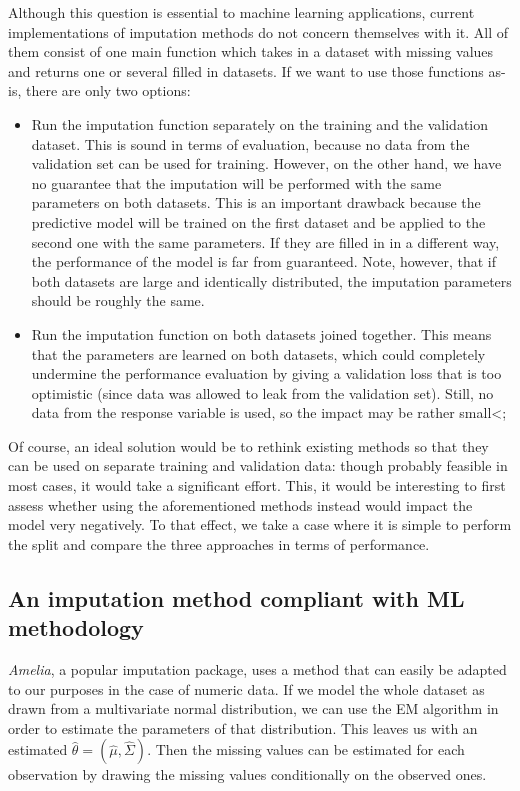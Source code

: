 \documentclass[12pt, a4paper]{article}
\begin{document}
Although this question is essential to machine learning applications, current implementations of imputation methods do not concern themselves with it. All of them consist of one main function which takes in a dataset with missing values and returns one or several filled in datasets. If we want to use those functions as-is, there are only two options:
\begin{itemize}
\item Run the imputation function separately on the training and the validation dataset. This is sound in terms of evaluation, because no data from the validation set can be used for training. However, on the other hand, we have no guarantee that the imputation will be performed with the same parameters on both datasets. This is an important drawback because the predictive model will be trained on the first dataset and be applied to the second one with the same parameters. If they are filled in in a different way, the performance of the model is far from guaranteed. Note, however, that if both datasets are large and identically distributed, the imputation parameters should be roughly the same.

\item Run the imputation function on both datasets joined together. This means that the parameters are learned on both datasets, which could completely undermine the performance evaluation by giving a validation loss that is too optimistic (since data was allowed to leak from the validation set). Still, no data from the response variable is used, so the impact may be rather small<;
\end{itemize}

Of course, an ideal solution would be to rethink existing methods so that they can be used on separate training and validation data: though probably feasible in most cases, it would take a significant effort. This, it would be interesting to first assess whether using the aforementioned methods instead would impact the model very negatively. To that effect, we take a case where it is simple to perform the split and compare the three approaches in terms of performance.
\subsection{An imputation method compliant with ML methodology}
\emph{Amelia}, a popular imputation package, uses a method that can easily be adapted to our purposes in the case of numeric data. If we model the whole dataset as drawn from a multivariate normal distribution, we can use the EM algorithm in order to estimate the parameters of that distribution. This leaves us with an estimated $\hat{\theta} = (\hat{\mu}, \hat{\Sigma})$. Then the missing values can be estimated for each observation by drawing the missing values conditionally on the observed ones.
\end{document}
